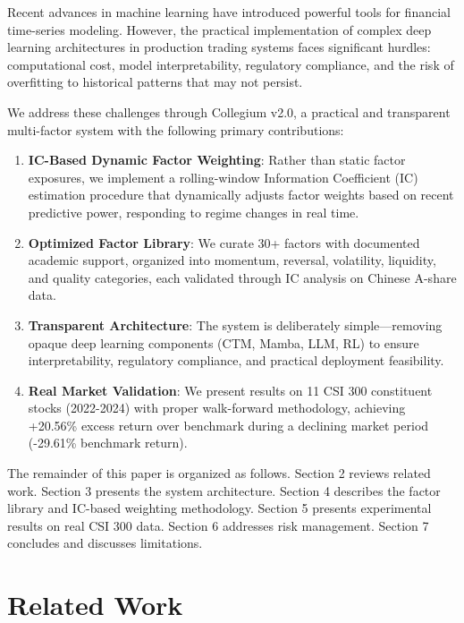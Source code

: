 \documentclass[12pt]{article}
\begin{document}
Recent advances in machine learning have introduced powerful tools for financial time-series modeling. However, the practical implementation of complex deep learning architectures in production trading systems faces significant hurdles: computational cost, model interpretability, regulatory compliance, and the risk of overfitting to historical patterns that may not persist.

We address these challenges through Collegium v2.0, a practical and transparent multi-factor system with the following primary contributions:

\begin{enumerate}
    \item \textbf{IC-Based Dynamic Factor Weighting}: Rather than static factor exposures, we implement a rolling-window Information Coefficient (IC) estimation procedure that dynamically adjusts factor weights based on recent predictive power, responding to regime changes in real time.

    \item \textbf{Optimized Factor Library}: We curate 30+ factors with documented academic support, organized into momentum, reversal, volatility, liquidity, and quality categories, each validated through IC analysis on Chinese A-share data.

    \item \textbf{Transparent Architecture}: The system is deliberately simple---removing opaque deep learning components (CTM, Mamba, LLM, RL) to ensure interpretability, regulatory compliance, and practical deployment feasibility.

    \item \textbf{Real Market Validation}: We present results on 11 CSI 300 constituent stocks (2022-2024) with proper walk-forward methodology, achieving +20.56\% excess return over benchmark during a declining market period (-29.61\% benchmark return).
\end{enumerate}

The remainder of this paper is organized as follows. Section 2 reviews related work. Section 3 presents the system architecture. Section 4 describes the factor library and IC-based weighting methodology. Section 5 presents experimental results on real CSI 300 data. Section 6 addresses risk management. Section 7 concludes and discusses limitations.

\section{Related Work}
\end{document}
